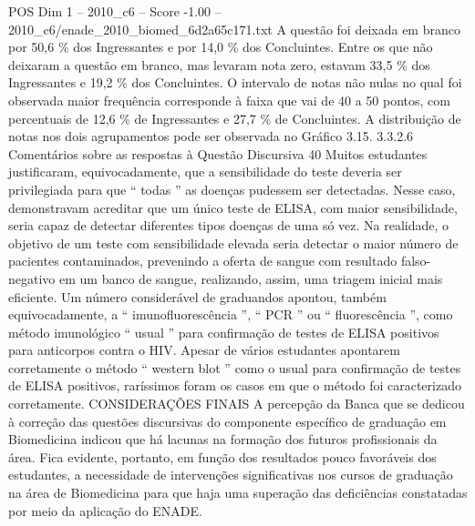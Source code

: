 \begin{textsample}{POS Dim 1 – 2010\_c6 – Score -1.00 – 2010\_c6/enade\_2010\_biomed\_6d2a65c171.txt}
A questão foi deixada em branco por 50,6 \% dos Ingressantes e por 14,0 \% dos Concluintes.
Entre os que não deixaram a questão em branco, mas levaram nota zero, estavam 33,5 \% dos Ingressantes e 19,2 \% dos Concluintes.
O intervalo de notas não nulas no qual foi observada maior frequência corresponde à faixa que vai de 40 a 50 pontos, com percentuais de 12,6 \% de Ingressantes e 27,7 \% de Concluintes.
A distribuição de notas nos dois agrupamentos pode ser observada no Gráfico 3.15. 3.3.2.6 Comentários sobre as respostas à Questão Discursiva 40 Muitos estudantes justificaram, equivocadamente, que a sensibilidade do teste deveria ser privilegiada para que “ todas ” as doenças pudessem ser detectadas.
Nesse caso, demonstravam acreditar que um único teste de ELISA, com maior sensibilidade, seria capaz de detectar diferentes tipos doenças de uma só vez.
Na realidade, o objetivo de um teste com sensibilidade elevada seria detectar o maior número de pacientes contaminados, prevenindo a oferta de sangue com resultado falso-negativo em um banco de sangue, realizando, assim, uma triagem inicial mais eficiente.
Um número considerável de graduandos apontou, também equivocadamente, a “ imunofluorescência ”, “ PCR ” ou “ fluorescência ”, como método imunológico “ usual ” para confirmação de testes de ELISA positivos para anticorpos contra o HIV.
Apesar de vários estudantes apontarem corretamente o método “ western blot ” como o usual para confirmação de testes de ELISA positivos, raríssimos foram os casos em que o método foi caracterizado corretamente.
CONSIDERAÇÕES FINAIS A percepção da Banca que se dedicou à correção das questões discursivas do componente específico de graduação em Biomedicina indicou que há lacunas na formação dos futuros profissionais da área.
Fica evidente, portanto, em função dos resultados pouco favoráveis dos estudantes, a necessidade de intervenções significativas nos cursos de graduação na área de Biomedicina para que haja uma superação das deficiências constatadas por meio da aplicação do ENADE.

\end{textsample}
